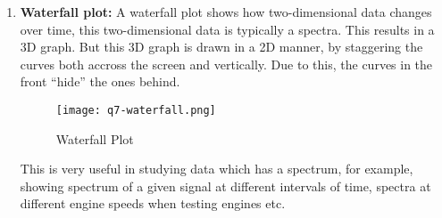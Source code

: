 \begin{tcolorbox}[breakable]
\begin{sol}
\begin{enumerate}
\begin{figure}[H]
				      \label{fig:coxcomb}
			      \end{figure}
			      Here in figure \ref{fig:coxcomb} I've shown the
			      same data shown before in figure \ref{fig:pareto}
			      in a coxcomb chart. Like a pie chart, a coxcomb
			      chart isn't useful when it comes to to large
			      number of categories of data. It's useful when we
			      have a small number of data which is categorical.
			\item \textbf{Waterfall plot:}
			      A waterfall plot shows how two-dimensional data
			      changes over time, this two-dimensional data is
			      typically a spectra. This results in a 3D graph.
			      But this 3D graph is drawn in a 2D manner, by
			      staggering the curves both accross the screen and
			      vertically. Due to this, the curves in the front
			      ``hide'' the ones behind.
			      \begin{figure}[H]
				      \centering
				      \texttt{[image: q7-waterfall.png]}
				      \caption{Waterfall Plot}
				      \label{fig:waterfall}
			      \end{figure}
			      This is very useful in
			      studying data which has a spectrum, for example,
			      showing spectrum of a given signal at different
			      intervals of time, spectra at different engine
			      speeds when testing engines etc.
		\end{enumerate}
	\end{sol}
\end{tcolorbox}
